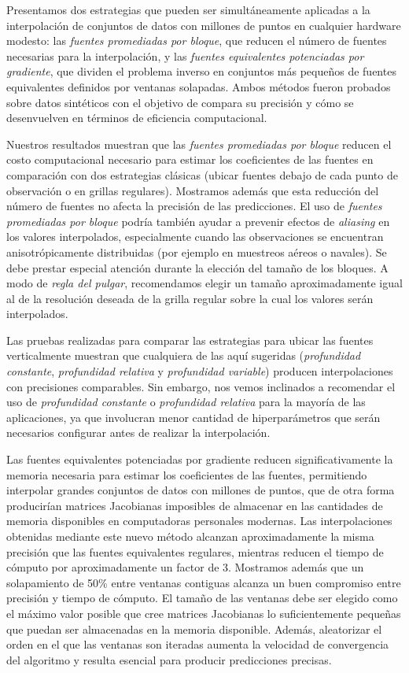 Presentamos dos estrategias que pueden ser simultáneamente aplicadas a la
interpolación de conjuntos de datos con millones de puntos en cualquier
hardware modesto: las \emph{fuentes promediadas por bloque}, que reducen el
número de fuentes necesarias para la interpolación, y las \emph{fuentes
equivalentes potenciadas por gradiente}, que dividen el problema inverso en
conjuntos más pequeños de fuentes equivalentes definidos por ventanas
solapadas.
Ambos métodos fueron probados sobre datos sintéticos con el objetivo de compara
su precisión y cómo se desenvuelven en términos de eficiencia computacional.

Nuestros resultados muestran que las \emph{fuentes promediadas por bloque}
reducen el costo computacional necesario para estimar los coeficientes de las
fuentes en comparación con dos estrategias clásicas (ubicar fuentes debajo de
cada punto de observación o en grillas regulares).
Mostramos además que esta reducción del número de fuentes no afecta la
precisión de las predicciones.
El uso de \emph{fuentes promediadas por bloque} podría también ayudar
a prevenir efectos de \emph{aliasing} en los valores interpolados,
especialmente cuando las observaciones se encuentran anisotrópicamente
distribuidas (por ejemplo en muestreos aéreos o navales).
Se debe prestar especial atención durante la elección del tamaño de los
bloques.
A modo de \emph{regla del pulgar}, recomendamos elegir un tamaño
aproximadamente igual al de la resolución deseada de la grilla regular sobre la
cual los valores serán interpolados.

Las pruebas realizadas para comparar las estrategias para ubicar las fuentes
verticalmente muestran que cualquiera de las aquí sugeridas
(\emph{profundidad constante}, \emph{profundidad relativa} y \emph{profundidad
variable})
producen interpolaciones con precisiones comparables.
Sin embargo, nos vemos inclinados a recomendar el uso de \emph{profundidad
constante} o \emph{profundidad relativa} para la mayoría de las aplicaciones, ya
que involucran menor cantidad de hiperparámetros que serán necesarios
configurar antes de realizar la interpolación.

Las fuentes equivalentes potenciadas por gradiente reducen significativamente
la memoria necesaria para estimar los coeficientes de las fuentes, permitiendo
interpolar grandes conjuntos de datos con millones de puntos, que de otra forma
producirían matrices Jacobianas imposibles de almacenar en las cantidades de
memoria disponibles en computadoras personales modernas.
Las interpolaciones obtenidas mediante este nuevo método alcanzan
aproximadamente la misma precisión que las fuentes equivalentes regulares,
mientras reducen el tiempo de cómputo por aproximadamente un factor de 3.
Mostramos además que un solapamiento de 50\% entre ventanas contiguas alcanza
un buen compromiso entre precisión y tiempo de cómputo.
El tamaño de las ventanas debe ser elegido como el máximo valor posible que
cree matrices Jacobianas lo suficientemente pequeñas que puedan ser
almacenadas en la memoria disponible.
Además, aleatorizar el orden en el que las ventanas son iteradas aumenta la
velocidad de convergencia del algoritmo y resulta esencial para producir
predicciones precisas.

